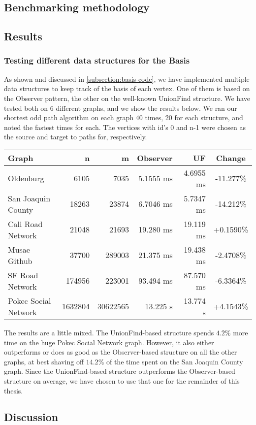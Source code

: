 \subsection{Benchmarking methodology}

\subsection{Results}
\subsubsection{Testing different data structures for the Basis}
\label{subsubsection:testing-basis}
As shown and discussed in \ref{subsection:basis-code}, we have implemented multiple data structures to keep track of the basis of each vertex. One of them is based on the Observer pattern, the other on the well-known UnionFind structure. We have tested both on 6 different graphs, and we show the results below. We ran our shortest odd path algorithm on each graph 40 times, 20 for each structure, and noted the fastest times for each. The vertices with id's 0 and n-1 were chosen as the source and target to paths for, respectively. 
\begin{center}
    \begin{tabular}{|l | r | r | r | r | c|} 
     \hline
     Graph & n & m & Observer & UF & Change \\ [0.5ex] 
     \hline\hline
     Oldenburg & 6105 & 7035 & 5.1555 ms & 4.6955 ms & -11.277\%\\ 
     \hline
     San Joaquin County & 18263 & 23874 & 6.7046 ms & 5.7347 ms & -14.212\%\\
     \hline
     Cali Road Network & 21048 & 21693 & 19.280 ms & 19.119 ms & +0.1590\%\\
     \hline
     Musae Github \cite{graph:musae-github} & 37700 & 289003 & 21.375 ms & 19.438 ms & -2.4708\%\\
     \hline
     SF Road Network & 174956 & 223001 & 93.494 ms & 87.570 ms & -6.3364\%\\ [1ex] 
     \hline
     Pokec Social Network \cite{graph:soc-pokec} & 1632804 & 30622565 & 13.225 s & 13.774 s & +4.1543\%\\ [1ex] 
     \hline
    \end{tabular}
\end{center}
The results are a little mixed. The UnionFind-based structure spends $4.2\%$ more time on the huge Pokec Social Network graph. However, it also either outperforms or does as good as the Observer-based structure on all the other graphs, at best shaving off $14.2\%$ of the time spent on the San Joaquin County graph. Since the UnionFind-based structure outperforms the Observer-based structure on average, we have chosen to use that one for the remainder of this thesis.

\subsection{Discussion}